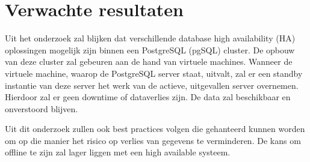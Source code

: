 
\section{Verwachte resultaten}
\label{sec:verwachte_resultaten}
Uit het onderzoek zal blijken dat verschillende database high availability (HA) oplossingen mogelijk zijn binnen een PostgreSQL (pgSQL) cluster. De opbouw van deze cluster zal gebeuren aan de hand van virtuele machines. Wanneer de virtuele machine, waarop de PostgreSQL server staat, uitvalt, zal er een standby instantie van deze server het werk van de actieve, uitgevallen server overnemen. Hierdoor zal er geen downtime of dataverlies zijn. De data zal beschikbaar en onverstoord blijven.

Uit dit onderzoek zullen ook best practices volgen die gehanteerd kunnen worden om op die manier het risico op verlies van gegevens te verminderen. De kans om offline te zijn zal lager liggen met een high available systeem.




